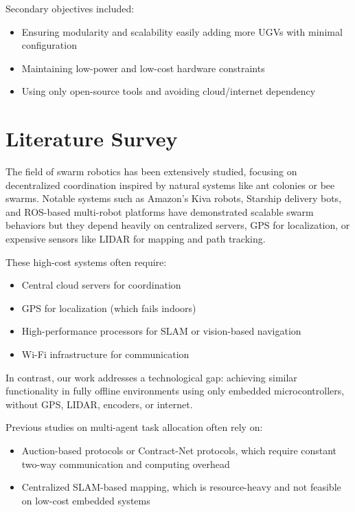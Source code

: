 \documentclass[a4paper,12pt]{report}
\begin{document}
Secondary objectives included:
\begin{itemize}
    \item Ensuring modularity and scalability easily adding more UGVs with minimal configuration
    \item Maintaining low-power and low-cost hardware constraints
    \item Using only open-source tools and avoiding cloud/internet dependency
\end{itemize}


\chapter{Literature Survey}
The field of swarm robotics has been extensively studied, focusing on decentralized coordination inspired by natural systems like ant colonies or bee swarms. Notable systems such as Amazon’s Kiva robots, Starship delivery bots, and ROS-based multi-robot platforms have demonstrated scalable swarm behaviors but they depend heavily on centralized servers, GPS for localization, or expensive sensors like LIDAR for mapping and path tracking.

These high-cost systems often require:
\begin{itemize}
    \item Central cloud servers for coordination
    \item GPS for localization (which fails indoors)
    \item High-performance processors for SLAM or vision-based navigation
    \item Wi-Fi infrastructure for communication
\end{itemize}

In contrast, our work addresses a technological gap: achieving similar functionality in fully offline environments using only embedded microcontrollers, without GPS, LIDAR, encoders, or internet.

Previous studies on multi-agent task allocation often rely on:
\begin{itemize}
    \item Auction-based protocols or Contract-Net protocols, which require constant two-way communication and computing overhead
    \item Centralized SLAM-based mapping, which is resource-heavy and not feasible on low-cost embedded systems
\end{itemize}
\end{document}
